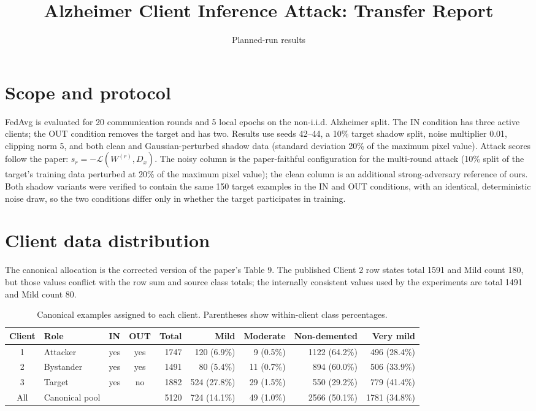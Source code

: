 \documentclass[10pt]{article}
\title{Alzheimer Client Inference Attack: Transfer Report}
\author{Planned-run results}
\date{}
\begin{document}
\maketitle
\thispagestyle{empty}

\section*{Scope and protocol}
FedAvg is evaluated for 20 communication rounds and 5 local epochs on the non-i.i.d. Alzheimer split.
The IN condition has three active clients; the OUT condition removes the target and has two.
Results use seeds 42--44, a 10\% target shadow split, noise multiplier 0.01, clipping norm 5,
and both clean and Gaussian-perturbed shadow data (standard deviation 20\% of the maximum pixel value).
Attack scores follow the paper: $s_r=-\mathcal{L}(W^{(r)},D_x)$.
The noisy column is the paper-faithful configuration for the multi-round attack (10\% split of the
target's training data perturbed at 20\% of the maximum pixel value); the clean column is an
additional strong-adversary reference of ours. Both shadow variants were verified to contain the same
150 target examples in the IN and OUT conditions, with an identical, deterministic noise draw, so the
two conditions differ only in whether the target participates in training.

\section*{Client data distribution}
The canonical allocation is the corrected version of the paper's Table 9. The published Client 2 row states total 1591 and Mild count 180, but those values conflict with the row sum and source class totals; the internally consistent values used by the experiments are total 1491 and Mild count 80.

\begin{table}[h]
\centering
\caption{Canonical examples assigned to each client. Parentheses show within-client class percentages.}
\begin{tabular}{clccrrrrr}
\toprule
Client & Role & IN & OUT & Total & Mild & Moderate & Non-demented & Very mild \\
\midrule
1 & Attacker & yes & yes & 1747 & 120 (6.9\%) & 9 (0.5\%) & 1122 (64.2\%) & 496 (28.4\%) \\
2 & Bystander & yes & yes & 1491 & 80 (5.4\%) & 11 (0.7\%) & 894 (60.0\%) & 506 (33.9\%) \\
3 & Target & yes & no & 1882 & 524 (27.8\%) & 29 (1.5\%) & 550 (29.2\%) & 779 (41.4\%) \\
\midrule
All & Canonical pool & & & 5120 & 724 (14.1\%) & 49 (1.0\%) & 2566 (50.1\%) & 1781 (34.8\%) \\
\bottomrule
\end{tabular}
\end{table}
\end{document}
